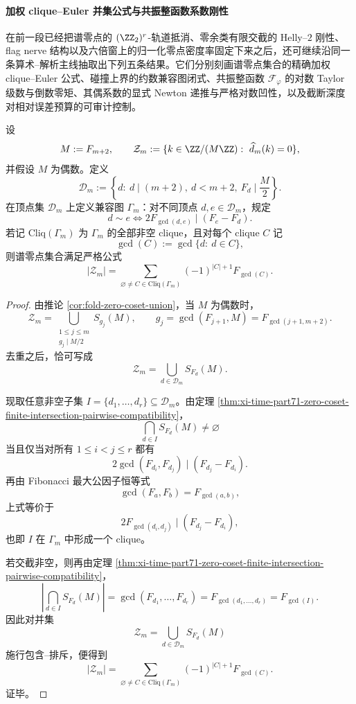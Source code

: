 \paragraph{加权 clique--Euler 并集公式与共振整函数系数刚性}
在前一段已经把谱零点的 \((\ZZ_2)^r\)-轨道抵消、零余类有限交截的 Helly--\(2\) 刚性、flag nerve 结构以及六倍窗上的归一化零点密度率固定下来之后，还可继续沿同一条算术--解析主线抽取出下列五条结果。它们分别刻画谱零点集合的精确加权 clique--Euler 公式、碰撞上界的约数兼容图闭式、共振整函数 \(\mathcal F_\varphi\) 的对数 Taylor 级数与倒数零矩、其偶系数的显式 Newton 递推与严格对数凹性，以及截断深度对相对误差预算的可审计控制。

\begin{theorem}\label{thm:xi-time-part71-zero-spectrum-weighted-clique-euler}
设
\[
M:=F_{m+2},
\qquad
\mathcal Z_m:=\{k\in \ZZ/(M\ZZ):\ \widehat d_m(k)=0\},
\]
并假设 \(M\) 为偶数。定义
\[
\mathcal D_m:=
\left\{
d:\ d\mid (m+2),\ d<m+2,\ F_d\mid \frac{M}{2}
\right\}.
\]
在顶点集 \(\mathcal D_m\) 上定义兼容图 \(\Gamma_m\)：对不同顶点 \(d,e\in\mathcal D_m\)，规定
\[
d\sim e
\iff
2F_{\gcd(d,e)}\mid (F_e-F_d).
\]
若记 \(\mathrm{Cliq}(\Gamma_m)\) 为 \(\Gamma_m\) 的全部非空 clique，且对每个 clique \(C\) 记
\[
\gcd(C):=\gcd\{d:\ d\in C\},
\]
则谱零点集合满足严格公式
\[
|\mathcal Z_m|
=
\sum_{\varnothing\neq C\in \mathrm{Cliq}(\Gamma_m)}
(-1)^{|C|+1}F_{\gcd(C)}.
\]
\end{theorem}
\begin{proof}
由推论 \ref{cor:fold-zero-coset-union}，当 \(M\) 为偶数时，
\[
\mathcal Z_m
=
\bigcup_{\substack{1\le j\le m\\ g_j\mid M/2}}S_{g_j}(M),
\qquad
g_j=\gcd(F_{j+1},M)=F_{\gcd(j+1,m+2)}.
\]
去重之后，恰可写成
\[
\mathcal Z_m=\bigcup_{d\in\mathcal D_m}S_{F_d}(M).
\]

现取任意非空子集 \(I=\{d_1,\dots,d_r\}\subseteq \mathcal D_m\)。由定理 \ref{thm:xi-time-part71-zero-coset-finite-intersection-pairwise-compatibility}，
\[
\bigcap_{d\in I}S_{F_d}(M)\neq\varnothing
\]
当且仅当对所有 \(1\le i<j\le r\) 都有
\[
2\gcd(F_{d_i},F_{d_j})\mid (F_{d_j}-F_{d_i}).
\]
再由 Fibonacci 最大公因子恒等式
\[
\gcd(F_a,F_b)=F_{\gcd(a,b)},
\]
上式等价于
\[
2F_{\gcd(d_i,d_j)}\mid (F_{d_j}-F_{d_i}),
\]
也即 \(I\) 在 \(\Gamma_m\) 中形成一个 clique。

若交截非空，则再由定理 \ref{thm:xi-time-part71-zero-coset-finite-intersection-pairwise-compatibility}，
\[
\left|
\bigcap_{d\in I}S_{F_d}(M)
\right|
=
\gcd(F_{d_1},\dots,F_{d_r})
=
F_{\gcd(d_1,\dots,d_r)}
=
F_{\gcd(I)}.
\]
因此对并集
\[
\mathcal Z_m=\bigcup_{d\in\mathcal D_m}S_{F_d}(M)
\]
施行包含--排斥，便得到
\[
|\mathcal Z_m|
=
\sum_{\varnothing\neq C\in \mathrm{Cliq}(\Gamma_m)}
(-1)^{|C|+1}F_{\gcd(C)}.
\]
证毕。
\end{proof}

